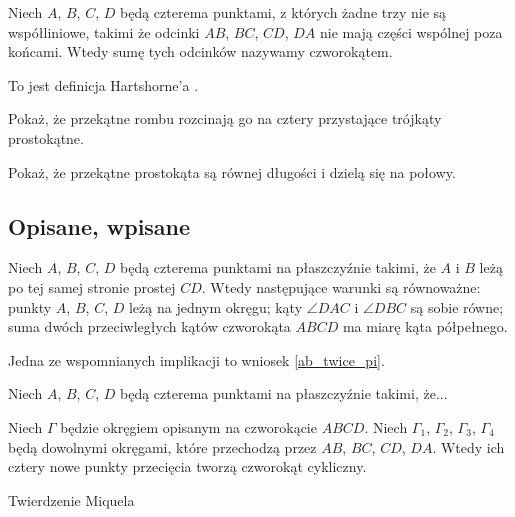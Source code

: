 %

\begin{definition}[czworokąt]
    Niech $A$, $B$, $C$, $D$ będą czterema punktami, z których żadne trzy nie są współliniowe, takimi że odcinki $AB$, $BC$, $CD$, $DA$ nie mają części wspólnej poza końcami.
    Wtedy sumę tych odcinków nazywamy czworokątem.
\end{definition}

To jest definicja Hartshorne'a \cite[s. 80]{hartshorne2000}.

Pokaż, że przekątne rombu rozcinają go na cztery przystające trójkąty prostokątne. %

Pokaż, że przekątne prostokąta są równej długości i dzielą się na połowy. %

\subsection{Opisane, wpisane}
\begin{proposition}
	\label{prp_incircle}
	Niech $A$, $B$, $C$, $D$ będą czterema punktami na płaszczyźnie takimi, że $A$ i $B$ leżą po tej samej stronie prostej $CD$.
	Wtedy następujące warunki są równoważne: punkty $A$, $B$, $C$, $D$ leżą na jednym okręgu; kąty $\angle DAC$ i $\angle DBC$ są sobie równe; suma dwóch przeciwległych kątów czworokąta $ABCD$ ma miarę kąta półpełnego.
\end{proposition}

Jedna ze wspomnianych implikacji to wniosek \ref{ab_twice_pi}.

\begin{proposition}
	\label{prp_excircle}
	Niech $A$, $B$, $C$, $D$ będą czterema punktami na płaszczyźnie takimi, że...
\end{proposition}

\begin{proposition}
	Niech $\Gamma$ będzie okręgiem opisanym na czworokącie $ABCD$.
	Niech $\Gamma_1$, $\Gamma_2$, $\Gamma_3$, $\Gamma_4$ będą dowolnymi okręgami, które przechodzą przez $AB$, $BC$, $CD$, $DA$.
	Wtedy ich cztery nowe punkty przecięcia tworzą czworokąt cykliczny.
\end{proposition}

Twierdzenie Miquela
\loremipsum
{} %



